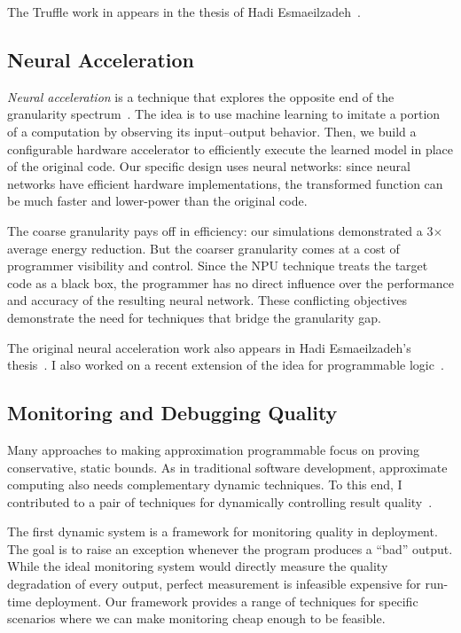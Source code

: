 The Truffle work in appears in the thesis of Hadi
Esmaeilzadeh~\cite{hadi-thesis}.


\subsection{Neural Acceleration}

\emph{Neural acceleration} is a technique that explores the opposite end of
the granularity spectrum~\cite{npu, snnap}.
The idea is to use machine learning to imitate a portion of a computation by
observing its input--output behavior.
Then, we build a configurable hardware accelerator to efficiently execute the
learned model in place of the original code.
Our specific design uses neural networks:
since neural networks have
efficient hardware implementations, the transformed function can be much
faster and lower-power than the original code.

The coarse granularity pays off in efficiency: our simulations demonstrated a
3$\times$ average energy reduction.
But the coarser granularity comes at a cost of programmer visibility and
control.
Since the NPU technique treats the target code as a black box, the
programmer has no direct influence over the performance and accuracy of the
resulting neural network.
These conflicting objectives demonstrate the need for techniques that bridge
the granularity gap.

The original neural acceleration work also appears in Hadi Esmaeilzadeh's
thesis~\cite{hadi-thesis}.
I also worked on a recent extension of the idea for programmable
logic~\cite{snnap}.


\subsection{Monitoring and Debugging Quality}

Many approaches to making approximation programmable focus on proving
conservative, static bounds.
As in traditional software development,
approximate computing also needs complementary dynamic techniques.
To this end, I contributed to a pair of techniques for dynamically controlling
result quality~\cite{approxdebug}.

The first dynamic system is a framework for monitoring quality in deployment.
The goal is to raise an exception whenever the program produces a ``bad''
output.
While the ideal monitoring system would directly measure the quality
degradation of every output,
perfect measurement is infeasible expensive for run-time deployment.
Our framework provides a range of techniques for specific scenarios where we
can make monitoring cheap enough to be feasible.

